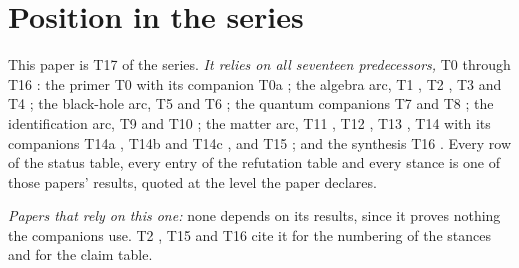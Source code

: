 \documentclass[11pt]{article}
\theoremstyle{definition}
\begin{document}
\section{Position in the series}\label{sec:position}

This paper is T17 of the series. \emph{It relies on all seventeen predecessors,} T0 \cite{ButlerT0} through T16 \cite{ButlerT16}: the primer T0 \cite{ButlerT0} with its companion T0a \cite{ButlerT0a}; the algebra arc, T1 \cite{ButlerT1}, T2 \cite{ButlerT2}, T3 \cite{ButlerT3} and T4 \cite{ButlerT4}; the black-hole arc, T5 \cite{ButlerT5} and T6 \cite{ButlerT6}; the quantum companions T7 \cite{ButlerT7} and T8 \cite{ButlerT8}; the identification arc, T9 \cite{ButlerT9} and T10 \cite{ButlerT10}; the matter arc, T11 \cite{ButlerT11}, T12 \cite{ButlerT12}, T13 \cite{ButlerT13}, T14 \cite{ButlerT14} with its companions T14a \cite{ButlerT14a}, T14b \cite{ButlerT14b} and T14c \cite{ButlerT14c}, and T15 \cite{ButlerT15}; and the synthesis T16 \cite{ButlerT16}. Every row of the status table, every entry of the refutation table and every stance is one of those papers' results, quoted at the level the paper declares.

\emph{Papers that rely on this one:} none depends on its results, since it proves nothing the companions use. T2 \cite{ButlerT2}, T15 \cite{ButlerT15} and T16 \cite{ButlerT16} cite it for the numbering of the stances and for the claim table.
\end{document}
